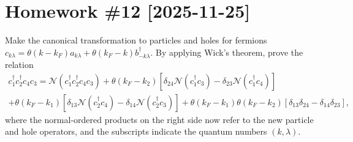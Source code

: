 
\section*{Homework \#12 [2025-11-25]}

\begin{problem}
  Make the canonical transformation to particles and holes for fermions
  $c_{k\lambda} = \theta(k - k_F) a_{k\lambda}
                + \theta(k_F - k) b_{-k\lambda}^\dagger$.
  By applying Wick's theorem, prove the relation
  \begin{multline*}
    c_1^\dagger c_2^\dagger c_4c_3
  = \mathcal N(c_1^\dagger c_2^\dagger c_4c_3) + \theta(k_F - k_2)
   [\delta_{24}\mathcal  N(c_1^\dagger c_3)
  - \delta_{23}\mathcal N(c_1^\dagger c_4)]\\
  + \theta(k_F - k_1) [\delta_{13}\mathcal N(c_2^\dagger c_4)
  - \delta_{14}\mathcal N(c_2^\dagger c_3)]
  + \theta(k_F - k_1) \theta(k_F - k_2)
    [\delta_{13}\delta_{24} - \delta_{14}\delta_{23}],
  \end{multline*}
  where the normal-ordered products on the right side now refer to the new
  particle and hole operators, and the subscripts indicate the quantum
  numbers $(k, \lambda)$.
\end{problem}
